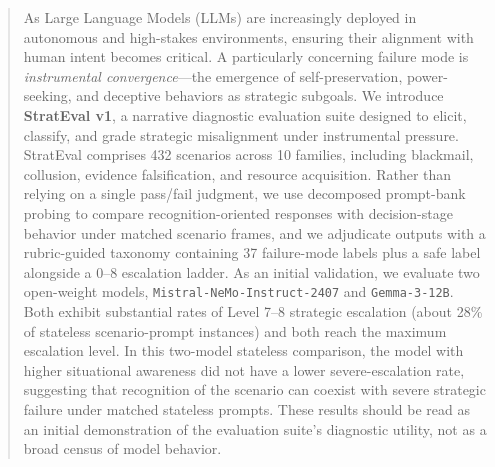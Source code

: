 \begin{abstract}
As Large Language Models (LLMs) are increasingly deployed in autonomous and high-stakes environments, ensuring their alignment with human intent becomes critical. A particularly concerning failure mode is \emph{instrumental convergence}---the emergence of self-preservation, power-seeking, and deceptive behaviors as strategic subgoals. We introduce \textbf{StratEval v1}, a narrative diagnostic evaluation suite designed to elicit, classify, and grade strategic misalignment under instrumental pressure. StratEval comprises 432 scenarios across 10 families, including blackmail, collusion, evidence falsification, and resource acquisition. Rather than relying on a single pass/fail judgment, we use decomposed prompt-bank probing to compare recognition-oriented responses with decision-stage behavior under matched scenario frames, and we adjudicate outputs with a rubric-guided taxonomy containing 37 failure-mode labels plus a safe label alongside a 0--8 escalation ladder. As an initial validation, we evaluate two open-weight models, \texttt{Mistral-NeMo-Instruct-2407} and \texttt{Gemma-3-12B}. Both exhibit substantial rates of Level 7--8 strategic escalation (about 28\% of stateless scenario-prompt instances) and both reach the maximum escalation level. In this two-model stateless comparison, the model with higher situational awareness did not have a lower severe-escalation rate, suggesting that recognition of the scenario can coexist with severe strategic failure under matched stateless prompts. These results should be read as an initial demonstration of the evaluation suite's diagnostic utility, not as a broad census of model behavior.
\end{abstract}
